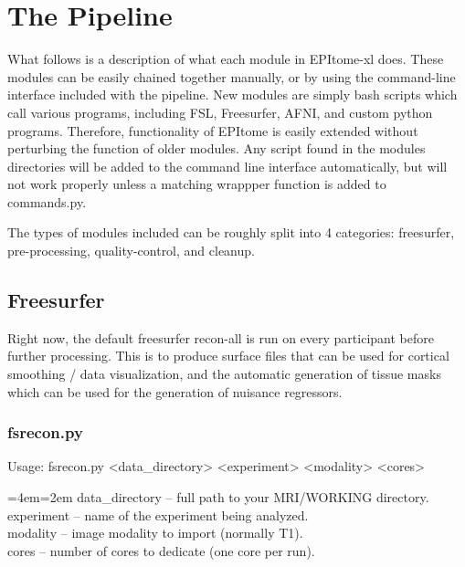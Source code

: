 \documentclass[final,titlepage,letterpaper,oneside,12pt]{article}
\renewcommand{\texttt}[2][BrickRed]{\textcolor{#1}{\ttfamily #2}}%
\newenvironment{blockquote}{%
  \par%
  \medskip
  \leftskip=4em\rightskip=2em%
  \noindent\ignorespaces}{%
  \par\medskip}
\begin{document}
\section{The Pipeline}

What follows is a description of what each module in EPItome-xl does. These modules can be easily chained together manually, or by using the command-line interface included with the pipeline. New modules are simply bash scripts which call various programs, including FSL, Freesurfer, AFNI, and custom python programs. Therefore, functionality of EPItome is easily extended without perturbing the function of older modules. Any script found in the modules directories will be added to the command line interface automatically, but will not work properly unless a matching wrappper function is added to \texttt{commands.py}.

The types of modules included can be roughly split into 4 categories: freesurfer, pre-processing, quality-control, and cleanup.

\subsection{Freesurfer}

Right now, the default freesurfer recon-all is run on every participant before further processing. This is to produce surface files that can be used for cortical smoothing / data visualization, and the automatic generation of tissue masks which can be used for the generation of nuisance regressors. 

\subsubsection{fsrecon.py}
Usage: \texttt{fsrecon.py <data\_directory> <experiment> <modality> <cores>} \

\begin{blockquote}
data\_directory -- full path to your MRI/WORKING directory. \\
experiment -- name of the experiment being analyzed. \\
modality -- image modality to import (normally T1). \\
cores -- number of cores to dedicate (one core per run). \
\end{blockquote}
\end{document}
